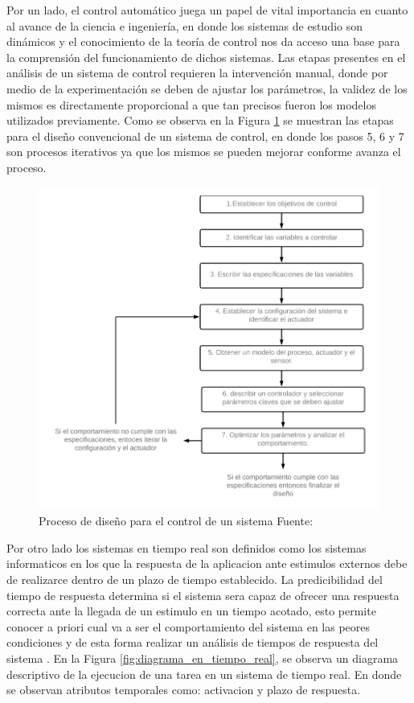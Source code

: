 \documentclass[12pt]{article}
\begin{document}

Por un lado, el control automático juega un papel de vital importancia en cuanto al avance de la ciencia e ingeniería, en donde los sistemas de estudio son dinámicos y el conocimiento de la teoría de control nos da acceso una base para la comprensión del funcionamiento de dichos sistemas. Las etapas presentes en el análisis de un sistema de control requieren la intervención manual, donde por medio de la experimentación se deben de ajustar los parámetros, la validez de los mismos es directamente proporcional a que tan precisos fueron los modelos utilizados previamente. Como se observa en la Figura \ref{fig:diagrama_control} se muestran las etapas para el diseño convencional de un sistema de control, en donde los pasos 5, 6 y 7 son procesos iterativos ya que los mismos se pueden mejorar conforme avanza el proceso. 


\begin{figure}[H]
  \centering
  \includegraphics[scale=0.5]{diagramas/diagrama_control.png}
  \caption{Proceso de diseño para el control de un sistema Fuente: \cite{4}}
  \label{fig:diagrama_control}
\end{figure}


Por otro lado los sistemas en tiempo real son definidos como los sistemas informaticos en los que la respuesta de la aplicacion ante estimulos externos debe de realizarce dentro de un plazo de tiempo establecido. La predicibilidad del tiempo de respuesta determina si el sistema sera capaz de ofrecer una respuesta correcta ante la llegada de un estimulo en un tiempo acotado, esto permite conocer a priori cual va a ser el comportamiento del sistema en las peores condiciones y de esta forma realizar un análisis de tiempos de respuesta del sistema \cite{alonso2010panoramica}. En la Figura \ref{fig:diagrama_en_tiempo_real}, se observa un diagrama descriptivo de la ejecucion de una tarea en un sistema de tiempo real. En donde se observan atributos temporales como: activacion y plazo de respuesta\cite{de2000introduccion}. 
\end{document}
